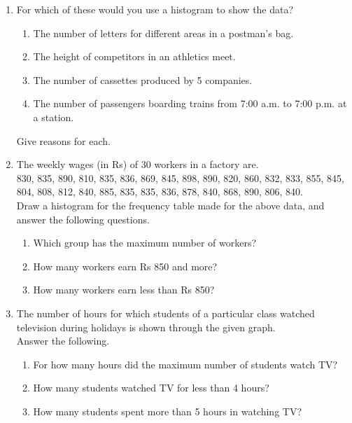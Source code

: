 \documentclass[a4paper,leqno,12pt]{amsart}
\begin{document}
\begin{enumerate}
\item For which of these would you use a histogram to show the data?
\begin{enumerate}
 \item The number of letters for different areas in a postman’s bag.
 \item The height of competitors in an athletics meet.
 \item The number of cassettes produced by 5 companies.
 \item The number of passengers boarding trains from 7:00 a.m. to 7:00 p.m. at a station.
\end{enumerate}
\vspace{1mm}
Give reasons for each.

\item The weekly wages (in Rs) of 30 workers in a factory are.\\
830, 835, 890, 810, 835, 836, 869, 845, 898, 890, 820, 860, 832, 833, 855, 845,
804, 808, 812, 840, 885, 835, 835, 836, 878, 840, 868, 890, 806, 840.\\
Draw a histogram for the frequency table made for the above data, and
answer the following questions.
\begin{enumerate}
 \item Which group has the maximum number of workers?
 \item How many workers earn Rs 850 and more?
 \item How many workers earn less than Rs 850?
\end{enumerate}

\item The number of hours for which students of a particular class watched television during
holidays is shown through the given graph.\\
\vspace{1mm}
Answer the following.
\begin{enumerate}
 \item For how many hours did the maximum number of students watch TV?
 \item How many students watched TV for less than 4 hours?
 \item How many students spent more than 5 hours in watching TV?
\end{enumerate}

\vspace{3mm}


\end{enumerate}
\end{document}
